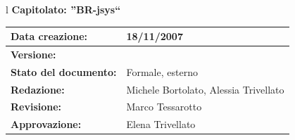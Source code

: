 \documentclass[11pt,titlepage,a4paper]{report}
\begin{document}
\begin{center}
\thispagestyle{plain}
\begin{table}[htbp]
\large{
\begin{tabular}{l}
\Large{\textbf{\textsf{Capitolato: ''BR-jsys``}}} \\
\begin{tabular}{||p{6cm}||p{6cm}||}
\hline
\textbf{Data creazione:} & 18/11/2007 \\ \hline
\textbf{Versione:} & \lv \\ \hline
\textbf{Stato del documento:} & Formale, esterno \\ \hline
\textbf{Redazione:} & Michele Bortolato, Alessia Trivellato \\ \hline
\textbf{Revisione:} &   Marco Tessarotto \\ \hline
\textbf{Approvazione:}  & Elena Trivellato\\ \hline
\end{tabular} \\
\end{tabular}
}
\end{table}


\end{center}
\end{document}
